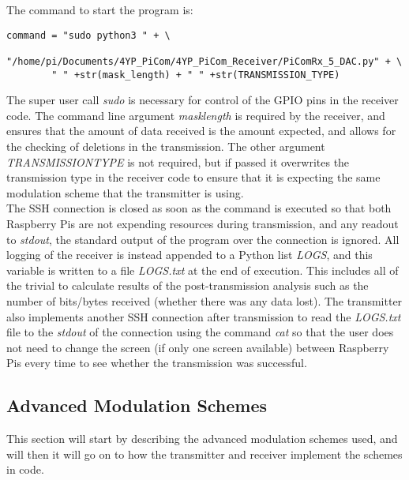 \documentclass[../main.tex]{subfiles}
\begin{document}
The command to start the program is:

\begin{lstlisting}[caption=Command Line to Start the Receiver]
	command = "sudo python3 " + \
		"/home/pi/Documents/4YP_PiCom/4YP_PiCom_Receiver/PiComRx_5_DAC.py" + \
		" " +str(mask_length) + " " +str(TRANSMISSION_TYPE)
\end{lstlisting}

The super user call \textit{sudo} is necessary for control of the GPIO pins in the receiver code.
The command line argument \textit{mask\textunderscore length} is required by the receiver, and ensures that the amount of data received is the amount expected, and allows for the checking of deletions in the transmission.
The other argument \textit{TRANSMISSION\textunderscore TYPE} is not required, but if passed it overwrites the transmission type in the receiver code to ensure that it is expecting the same modulation scheme that the transmitter is using.\\

The SSH connection is closed as soon as the command is executed so that both Raspberry Pis are not expending resources during transmission, and any readout to \textit{stdout}, the standard output of the program over the connection is ignored.
All logging of the receiver is instead appended to a Python list \textit{LOGS}, and this variable is written to a file \textit{LOGS.txt} at the end of execution.
This includes all of the trivial to calculate results of the post-transmission analysis such as the number of bits/bytes received (whether there was any data lost).
\todo[inline]{Clearly check below once done}
The transmitter also implements another SSH connection after transmission to read the \textit{LOGS.txt} file to the \textit{stdout} of the connection using the command \textit{cat} so that the user does not need to change the screen (if only one screen available) between Raspberry Pis every time to see whether the transmission was successful.\\

\subsection{Advanced Modulation Schemes} \label{sec_Advanced Modulation Schemes}


This section will start by describing the advanced modulation schemes used, and will then it will go on to how the transmitter and receiver implement  the schemes in code.\\
\end{document}

